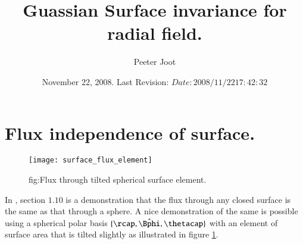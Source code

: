 \documentclass{article}
\title{ Guassian Surface invariance for radial field. }
\author{Peeter Joot}
\date{ November 22, 2008.  Last Revision: $Date: 2008/11/22 17:42:32 $ }
\newcommand{\phicap}[0]{\hat{\Bphi}}
\begin{document}
\maketitle{}
\section{ Flux independence of surface. }

\begin{figure}[htp]
\centering
\texttt{[image: surface\_flux\_element]}
\caption{fig:Flux through tilted spherical surface element.}
\label{fig:surface_flux_element}
\end{figure}

In \cite{purcell1963eam}, section $1.10$ is a demonstration that the flux
through any closed surface is the same as that through a sphere.
A nice demonstration of the same is possible using a spherical polar basis
$\{\rcap, \phicap, \thetacap\}$ with an element of surface area that is
tilted slightly as illustrated in figure \ref{fig:surface_flux_element}.



\end{document}
